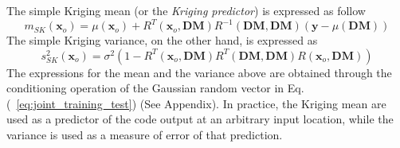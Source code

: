 The simple Kriging mean (or the \emph{Kriging predictor}) is expressed as follow
\begin{equation}
	m_{SK} (\mathbf{x}_o) = \mu (\mathbf{x}_o) + R^T(\mathbf{x}_o, \mathbf{DM}) R^{-1}(\mathbf{DM}, \mathbf{DM}) (\mathbf{y} - \mu(\mathbf{DM}))
\label{eq:mean_sk}
\end{equation}
The simple Kriging variance, on the other hand, is expressed as
\begin{equation}
	s^2_{SK} (\mathbf{x}_o) = \sigma^2 (1 - R^T(\mathbf{x}_o, \mathbf{DM}) R^T(\mathbf{DM}, \mathbf{DM}) R(\mathbf{x}_o, \mathbf{DM}))
\label{eq:variance_sk}
\end{equation}
The expressions for the mean and the variance above are obtained through the conditioning operation of the Gaussian random vector in Eq.(~\ref{eq:joint_training_test}) (See Appendix). 
In practice, the Kriging mean are used as a predictor of the code output at an arbitrary input location, 
while the variance is used as a measure of error of that prediction.

